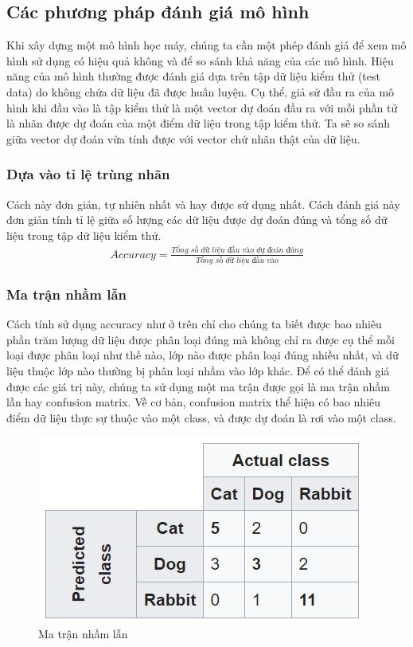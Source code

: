 \subsection{Các phương pháp đánh giá mô hình}
Khi xây dựng một mô hình học máy, chúng ta cần một phép đánh giá để xem mô hình sử dụng có hiệu quả không và để so sánh khả năng của các mô hình. Hiệu năng của mô hình thường được đánh giá dựa trên tập dữ liệu kiểm thử (test data) do không chứa dữ liệu đã được huấn luyện. Cụ thể, giả sử đầu ra của mô hình khi đầu vào là tập kiểm thử là một vector dự đoán đầu ra với mỗi phần tử là nhãn được dự đoán của một điểm dữ liệu trong tập kiểm thử. Ta sẽ so sánh giữa vector dự đoán vừa tính được với vector chứ nhãn thật của dữ liệu.
\subsubsection{Dựa vào tỉ lệ trùng nhãn}
Cách này đơn giản, tự nhiên nhất và hay được sử dụng nhất. Cách đánh giá này đơn giản tính tỉ lệ giữa số lượng các dữ liệu được dự đoán đúng và tổng số dữ liệu trong tập dữ liệu kiểm thử.
\begin{align*}
Accuracy = \frac{\textit{Tổng số dữ liệu đầu vào dự đoán đúng}}{\textit{Tổng số dữ liệu đầu vào}}
\end{align*}
\subsubsection{Ma trận nhầm lẫn}
Cách tính sử dụng accuracy như ở trên chỉ cho chúng ta biết được bao nhiêu phần trăm lượng dữ liệu được phân loại đúng mà không chỉ ra được cụ thể mỗi loại được phân loại như thế nào, lớp nào được phân loại đúng nhiều nhất, và dữ liệu thuộc lớp nào thường bị phân loại nhầm vào lớp khác. Để có thể đánh giá được các giá trị này, chúng ta sử dụng một ma trận được gọi là ma trận nhầm lẫn hay confusion matrix. 
Về cơ bản, confusion matrix thể hiện có bao nhiêu điểm dữ liệu thực sự thuộc vào một class, và được dự đoán là rơi vào một class.

\begin{figure}[H]
\begin{center}
\includegraphics[scale=1]{chap3/image/confusionmatrix5.png}
\end{center}
\caption{Ma trận nhầm lẫn}
\label{fig:con_matrix}
\end{figure}

